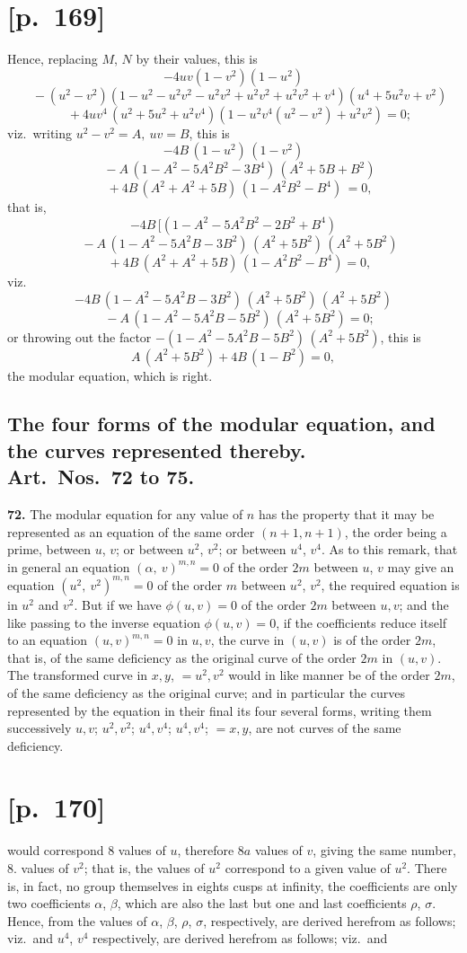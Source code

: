 \documentclass[11pt]{article}
\begin{document}
\section*{[p.~169]}
Hence, replacing $M$, $N$ by their values, this is
\[
-4uv(1-v^2)(1-u^2)
\]
\[
\quad-(u^2-v^2)(1-u^2-u^2v^2-u^2v^2+u^2v^2+u^2v^2+v^4)(u^4+5u^2v+v^2)
\]
\[
\quad+4uv^4\,(u^2+5u^2+u^2v^4)(1-u^2v^4(u^2-v^2)+u^2v^2)=0;
\]
viz.\ writing $u^2-v^2=A,\ uv=B$, this is
\[
-4B\,(1-u^2)\,(1-v^2)
\]
\[
\quad-A\,(1-A^2-5A^2B^2-3B^4)\,(A^2+5B+B^2)
\]
\[
\quad+4B\,(A^2+A^2+5B)\,(1-A^2B^2-B^4)\,=0,
\]
that is,
\[
-4B\,[(1-A^2-5A^2B^2-2B^2+B^4)
\]
\[
\quad-A\,(1-A^2-5A^2B-3B^2)\,(A^2+5B^2)\,(A^2+5B^2)
\]
\[
\quad+4B\,(A^2+A^2+5B)\,(1-A^2B^2-B^4)=0,
\]
viz.\
\[
-4B\,(1-A^2-5A^2B-3B^2)\,(A^2+5B^2)\,(A^2+5B^2)
\]
\[
\quad-A\,(1-A^2-5A^2B-5B^2)\,(A^2+5B^2)=0;
\]
or throwing out the factor $-(1-A^2-5A^2B-5B^2)\,(A^2+5B^2)$, this is
\[
A\,(A^2+5B^2)+4B\,(1-B^2)=0,
\]
the modular equation, which is right.

\subsection*{The four forms of the modular equation, and the curves represented thereby.\\
Art.\ Nos.\ 72 to 75.}

\noindent\textbf{72.} The modular equation for any value of $n$ has the property that it may be
represented as an equation of the same order $(n+1, n+1)$, the order being a prime, between
$u$, $v$; or between $u^2$, $v^2$; or between $u^4$, $v^4$. As to this remark, that
in general an equation $(\alpha,\ v)^{m,n}=0$ of the order $2m$ between $u$, $v$ may give an equation
$(u^2,\ v^2)^{m,n}=0$ of the order $m$ between $u^2$, $v^2$, the required equation is in
$u^2$ and $v^2$. But if we have $\phi(u,v)=0$ of the order $2m$ between $u,v$; and the like passing to
the inverse equation $\phi(u,v)=0$, if the coefficients reduce itself to an equation
$(u,v)^{m,n}=0$ in $u,v$, the curve in $(u,v)$ is of the order $2m$, that is, of the
same deficiency as the original curve of the order $2m$ in $(u,v)$. The transformed curve in
$x,y$, $=u^2,v^2$ would in like manner be of the order $2m$, of the same deficiency as the
original curve; and in particular the curves represented by the equation in their final
its four several forms, writing them successively $u,v$; $u^2,v^2$; $u^4,v^4$; $u^4,v^4$; $=x,y$,
are not curves of the same deficiency.

\section*{[p.~170]}
would correspond $8$ values of $u$, therefore $8a$ values of $v$, giving the same number,
$8$. values of $v^2$; that is, the values of $u^2$ correspond to a given value of $u^2$. There is, in fact, no
group themselves in eights cusps at infinity, the coefficients are only two coefficients $\alpha$, $\beta$,
which are also the last but one and last coefficients $\rho$, $\sigma$. Hence, from the values of
$\alpha$, $\beta$, $\rho$, $\sigma$, respectively, are derived herefrom as follows; viz.\ and
$u^4$, $v^4$ respectively, are derived herefrom as follows; viz.\ and
\end{document}
